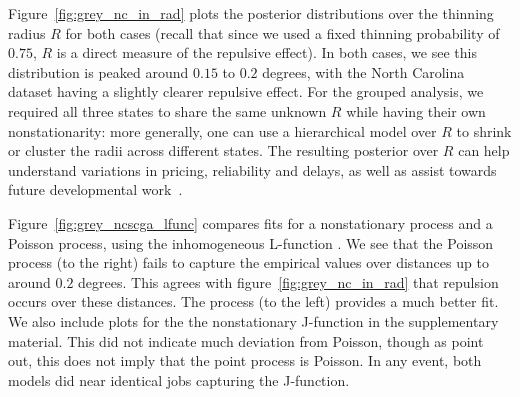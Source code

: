 \documentclass{statsoc}
\begin{document}
Figure~\ref{fig:grey_nc_in_rad} plots the posterior distributions over the thinning radius $R$ for both cases (recall that
since we used a fixed thinning probability of $0.75$, $R$ is a direct measure of the repulsive effect). 
In both cases, we see this distribution is peaked around $0.15$ to $0.2$ degrees, with the North Carolina dataset having a slightly clearer
repulsive effect. %
For the grouped analysis, we required all three states to share the same unknown $R$ while having their own nonstationarity: more generally, one can 
use a hierarchical model over $R$ to shrink or cluster the radii across different states. The resulting posterior over $R$ can help understand 
variations in pricing, reliability and delays, as well as assist towards future developmental work~\citep{Sahin2007}.

Figure~\ref{fig:grey_ncscga_lfunc} compares fits for a nonstationary \matern process and a Poisson process, using the inhomogeneous
L-function \citep{Baddely2000}. %
We see that the Poisson process (to the right) fails
to capture the empirical values over distances up to around $0.2$ degrees. This agrees with  figure~\ref{fig:grey_nc_in_rad} that repulsion occurs over 
these distances. The \matern process (to the left) provides a much better fit. %
We also include plots for the the nonstationary J-function in the supplementary material. This did not indicate much deviation from Poisson, 
though as \cite{Baddely2000} point out, this does not imply that the point process is Poisson. In any event, both models did near identical jobs 
capturing the J-function.
\end{document}
